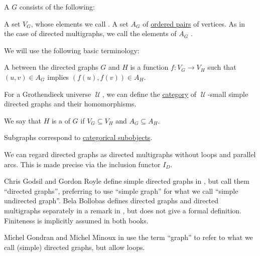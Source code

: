 \begin{definition}\label{def:directed_graph}
  A  \( G \) consists of the following:
  \begin{thmenum}[series=def:directed_graph]
     A set \( V_G \), whose elements we call .
     A set \( A_G \) of \hyperref[def:cartesian_product/kuratowski_pair]{ordered pairs} of  vertices. As in the case of directed multigraphs, we call the elements of \( A_G \) .
  \end{thmenum}

  We will use the following basic terminology:
  \begin{thmenum}[resume=def:directed_graph]
     A  between the directed graphs \( G \) and \( H \) is a function \( f: V_G \to V_H \) such that \( (u, v) \in A_G \) implies \( (f(u), f(v)) \in A_H \).

     For a Grothendieck universe \( \mscrU \), we can define the \hyperref[def:category]{category} of \( \mscrU \)-small simple directed graphs and their homomorphisms.

    \mimprovised We say that \( H \) is a  of \( G \) if \( V_G \subseteq V_H \) and \( A_G \subseteq A_H \).

    Subgraphs correspond to \hyperref[def:subobject_and_quotient]{categorical subobjects}.
  \end{thmenum}
\end{definition}
\begin{comments}
  \item We can regard directed graphs as directed multigraphs without loops and parallel arcs. This is made precise via the inclusion functor \hyperref[def:graph_functors/directed_inclusion]{\( I_D \)}.

  \item Chris Godsil and Gordon Royle define simple directed graphs in \cite[2]{GodsilRoyle2001}, but call them \enquote{directed graphs}, preferring to use \enquote{simple graph} for what we call \enquote{simple undirected graph}. Bela Bollobas defines directed graphs and directed multigraphs separately in a remark in \cite[8]{Bollobas1998}, but does not give a formal definition. Finiteness is implicitly assumed in both books.

  Michel Gondran and Michel Minoux in \cite[2]{GondranMinoux1984Graphs} use the term \enquote{graph} to refer to what we call (simple) directed graphs, but allow loops.
\end{comments}

